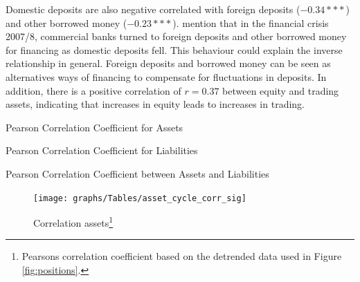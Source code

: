 \documentclass[12pt, a4paper]{article} %
\begin{document}
Domestic deposits are also negative correlated with foreign deposits ($-0.34***$) and other borrowed money ($-0.23***$). \cite{bassett2008profits} mention that in the financial crisis 2007/8, commercial banks turned to foreign deposits and other borrowed money for financing as domestic deposits fell. This behaviour could explain the inverse relationship in general. Foreign deposits and borrowed money can be seen as alternatives ways of financing to compensate for fluctuations in deposits.
In addition, there is a positive correlation of $r=0.37$ between equity and trading assets, indicating that increases in equity leads to increases in trading.\\



\begin{table}[H]
\begin{minipage}{\textwidth}
\scriptsize

\caption[1]{Pearson Correlation Coefficient for Assets}
\label{tab:corr_assets}
\end{minipage}
\end{table}

\begin{table}[H]
\begin{minipage}{\textwidth}
\scriptsize
\hskip-2.0cm

\caption[1]{Pearson Correlation Coefficient for Liabilities}
\label{tab:corr_liab}
\end{minipage}
\end{table}


\begin{table}[H]
\begin{minipage}{\textwidth}
\scriptsize
\hskip-2.0cm

\caption[1]{Pearson Correlation Coefficient between Assets and Liabilities}
\label{tab:corr_comb}
\end{minipage}
\end{table}

\iffalse
\begin{figure}[H]
\begin{minipage}{\textwidth}
\centering
\caption[1]{Correlation assets\footnote{Pearsons correlation coefficient based on the detrended data used in Figure \ref{fig:positions}.} }
\texttt{[image: graphs/Tables/asset\_cycle\_corr\_sig]}
\label{fig:corr_assets}
\end{minipage}
\end{figure}
\hskip-2.0cm
\end{document}
